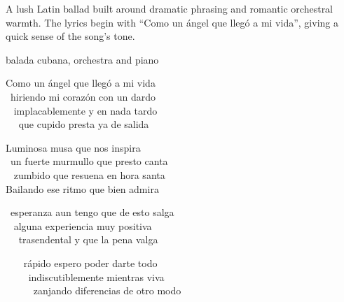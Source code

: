 

\begin{notes}
A lush Latin ballad built around dramatic phrasing and romantic orchestral warmth. %
The lyrics begin with “Como un ángel que llegó a mi vida”, giving a quick sense of the song’s tone.
\end{notes}

\begin{style}
balada cubana, orchestra and piano
\end{style}

\begin{lyrics}
Como un ángel que llegó a mi vida\\
 hiriendo mi corazón con un dardo\\
  implacablemente y en nada tardo\\
   que cupido presta ya de salida

Luminosa musa que nos inspira\\
 un fuerte murmullo que presto canta\\
  zumbido que resuena en hora santa \\
Bailando ese ritmo que bien admira

 esperanza aun tengo que de esto salga\\
  alguna experiencia muy positiva\\
   trasendental y que la pena valga

    rápido espero poder darte todo\\
     indiscutiblemente mientras viva\\
      zanjando diferencias de otro modo

\end{lyrics}

